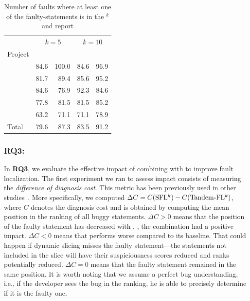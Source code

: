 \documentclass{article}
\begin{document}
\begin{table}[h!]
	\vspace{-0.2cm}
	
	\small
	\setlength{\tabcolsep}{3pt}
	\centering
\begin{tabular}{l|rr|rr}
		 \toprule
       & \multicolumn{2}{c|}{$k=5$} & \multicolumn{2}{c}{$k=10$} \\
		 Project        &   \sfl{}   & \comb &   \sfl{}   & \comb\\
		\midrule
		 \lang{}         &   84.6   & 100.0 & 84.6 & 96.9  \\
		\cmath{}           & 81.7 & 89.4 & 85.6 & 95.2 \\
		\chart{}           & {\cellcolor{Gray} 84.6} & {\cellcolor{Gray}76.9} & {\cellcolor{Gray}92.3} & {\cellcolor{Gray}84.6}\\
		\jtime{}           & 77.8 & 81.5 & 81.5 & 85.2\\
		\mockito{}           & 63.2 & 71.1 & 71.1 & 78.9\\   \midrule
		Total         & 79.6 & 87.3 & 83.5 & 91.2\\
		\bottomrule
	\end{tabular}
  \caption {Number of faults where at least one of the faulty-statements is in the \sfl{}$^{k}$ and  report}
  \label{table:fsws}
\vspace{-0.4cm}
\end{table}

\subsubsection{RQ3: \textit{\rqthree}}

In \textbf{RQ3}, we evaluate the effective impact of combining \ds{}
with \sfl{} to improve fault localization. The first experiment we ran to assess impact consists of measuring the
\emph{difference of diagnosis cost}. This metric has been previously
used in other studies~\cite{7390282,ang-perez-van-deursen-rui-2017,Pearson:2017:EIF:3097368.3097441,Perez:2018:LQR:3304889.3304927}. More specifically, we computed
$\Delta{}C = C(\textrm{SFL$^{k}$}) - C(\textrm{Tandem-FL$^{k}$})$, where
$C$ denotes the diagnosis cost and is obtained by computing the mean
position in the ranking of all buggy statements. $\Delta C >0$ means
that the position of the faulty statement has decreased with
, \ie{}, the combination had a positive impact. $\Delta C
<0$ means that  performs worse compared to its
baseline. That could happen if dynamic slicing misses the faulty
statement---the statements not included in the slice will have their
suspiciousness scores reduced and ranks potentially reduced. $\Delta
C=0$ means that the faulty statement remained in the same position.
It is worth noting that we assume a perfect bug understanding, i.e.,
if the developer sees the bug in the ranking, he is able to precisely
determine if it is the faulty one.
\end{document}
